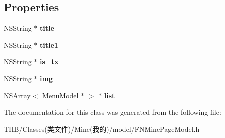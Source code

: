\subsection*{Properties}
\begin{DoxyCompactItemize}
\item 
\mbox{\label{interface_j_m___m_p_m__wallet_a031022faaa011f44d8f9c7f275c20d41}} 
N\+S\+String $\ast$ {\bfseries title}
\item 
\mbox{\label{interface_j_m___m_p_m__wallet_afd39d23365847fc59a2d3278bc631139}} 
N\+S\+String $\ast$ {\bfseries title1}
\item 
\mbox{\label{interface_j_m___m_p_m__wallet_ab7f771d21db74ce907467a5856447915}} 
N\+S\+String $\ast$ {\bfseries is\+\_\+tx}
\item 
\mbox{\label{interface_j_m___m_p_m__wallet_a94fc3864dea7ecf2d4d0c884a37084b1}} 
N\+S\+String $\ast$ {\bfseries img}
\item 
\mbox{\label{interface_j_m___m_p_m__wallet_a9ce62f90bab1ceb31504a7c16e808c1b}} 
N\+S\+Array$<$ \mbox{\hyperlink{interface_menu_model}{Menu\+Model}} $\ast$ $>$ $\ast$ {\bfseries list}
\end{DoxyCompactItemize}


The documentation for this class was generated from the following file\+:\begin{DoxyCompactItemize}
\item 
T\+H\+B/\+Classes(类文件)/\+Mine(我的)/model/F\+N\+Mine\+Page\+Model.\+h\end{DoxyCompactItemize}
